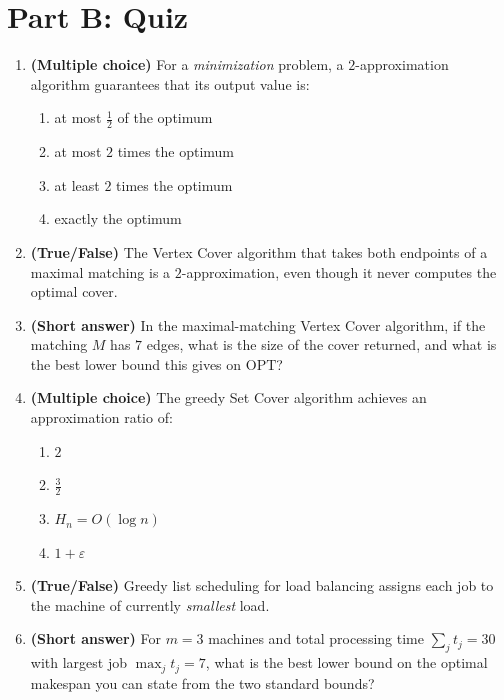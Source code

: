 \documentclass[11pt]{article}
\begin{document}
\newpage
\section*{Part B: Quiz}

\begin{enumerate}[label=\textbf{B\arabic*.}, leftmargin=2.2em]

\item \textbf{(Multiple choice)} For a \emph{minimization} problem, a $2$-approximation
algorithm guarantees that its output value is:
\begin{enumerate}[label=(\alph*)]
    \item at most $\tfrac12$ of the optimum
    \item at most $2$ times the optimum
    \item at least $2$ times the optimum
    \item exactly the optimum
\end{enumerate}

\item \textbf{(True/False)} The Vertex Cover algorithm that takes both endpoints of a
maximal matching is a $2$-approximation, even though it never computes the optimal cover.

\item \textbf{(Short answer)} In the maximal-matching Vertex Cover algorithm, if the
matching $M$ has $7$ edges, what is the size of the cover returned, and what is the best
lower bound this gives on $\mathrm{OPT}$?

\item \textbf{(Multiple choice)} The greedy Set Cover algorithm achieves an approximation
ratio of:
\begin{enumerate}[label=(\alph*)]
    \item $2$
    \item $\tfrac32$
    \item $H_n = O(\log n)$
    \item $1 + \varepsilon$
\end{enumerate}

\item \textbf{(True/False)} Greedy list scheduling for load balancing assigns each job to
the machine of currently \emph{smallest} load.

\item \textbf{(Short answer)} For $m = 3$ machines and total processing time $\sum_j t_j =
30$ with largest job $\max_j t_j = 7$, what is the best lower bound on the optimal makespan
you can state from the two standard bounds?


\end{enumerate}
\end{document}

